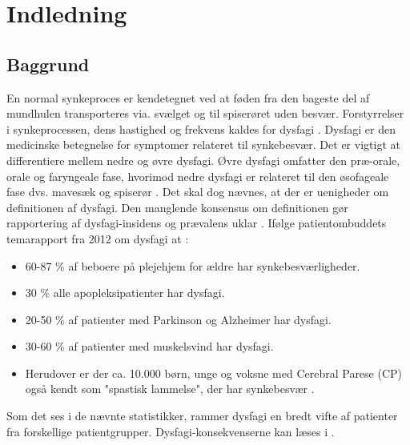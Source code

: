\chapter{Indledning}

\section{Baggrund}
En normal synkeproces er kendetegnet ved at føden  fra den bageste del af mundhulen transporteres via. svælget og til spiserøret uden besvær. Forstyrrelser i synkeprocessen, dens hastighed og frekvens kaldes for dysfagi \cite{Sundhedsstyrelsen2015}. Dysfagi er den medicinske betegnelse for symptomer  relateret til synkebesvær. Det er vigtigt at differentiere mellem nedre og øvre dysfagi. Øvre dysfagi omfatter den præ-orale, orale og faryngeale fase, hvorimod nedre dysfagi er relateret til den øsofageale fase dvs. mavesæk og spiserør \cite{Kjaersgaard2013}. Det skal dog nævnes, at der er uenigheder om definitionen af dysfagi. Den manglende konsensus om definitionen gør rapportering af dysfagi-insidens og prævalens uklar \cite{Kjaersgaard2013}. Ifølge patientombuddets temarapport fra 2012 om dysfagi at \cite{Bommersholdt2012}:

\begin{itemize}
\item 60-87 \% af beboere på plejehjem for ældre har synkebesværligheder.
\item 30 \% alle apopleksipatienter har dysfagi.
\item 20-50 \% af patienter med Parkinson og Alzheimer har dysfagi.
\item 30-60 \% af patienter med muskelsvind har dysfagi.
\item Herudover er der ca. 10.000 børn, unge og voksne med Cerebral Parese (CP) også kendt som "spastisk lammelse", der har synkebesvær . 
\end{itemize}

Som det ses i de nævnte statistikker, rammer dysfagi en bredt vifte af patienter fra forskellige patientgrupper. Dysfagi-konsekvenserne kan læses i . 

